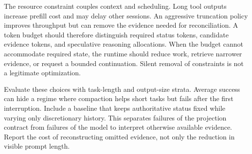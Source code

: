 The resource constraint couples context and scheduling. Long tool outputs increase prefill cost and may delay other sessions. An aggressive truncation policy improves throughput but can remove the evidence needed for reconciliation. A token budget should therefore distinguish required status tokens, candidate evidence tokens, and speculative reasoning allocations. When the budget cannot accommodate required state, the runtime should reduce work, retrieve narrower evidence, or request a bounded continuation. Silent removal of constraints is not a legitimate optimization.

Evaluate these choices with task-length and output-size strata. Average success can hide a regime where compaction helps short tasks but fails after the first interruption. Include a baseline that keeps authoritative status fixed while varying only discretionary history. This separates failures of the projection contract from failures of the model to interpret otherwise available evidence. Report the cost of reconstructing omitted evidence, not only the reduction in visible prompt length.

